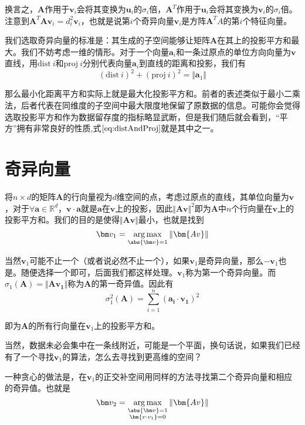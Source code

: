 \documentclass[UTF8]{ctexbook}
\newcommand{\Frobenius}[1]{\Vert #1 \Vert}
\begin{document}
换言之，$\bm A$作用于$\bm v_i$会将其变换为$\bm u_i$的$\sigma_i$倍，$\bm A^T$作用于$\bm u_i$会将其变换为$\bm v_i$的$\sigma_i$倍。注意到$\bm A^T\bm A \bm v_i = d_i^2 \bm v_i$，也就是说第$i$个奇异向量$\bm v_i$是方阵$\bm A^T A$的第$i$个特征向量。

我们选取奇异向量的标准是：其生成的子空间能够让矩阵$\bm A$在其上的投影平方和最大。我们不妨考虑一维的情形。对于一个向量$\bm a_i$和一条过原点的单位方向向量为$\bm v$直线，用$\text{dist} \ i$和$\text{proj} \ i$分别代表向量$\bm a_i$到直线的距离和投影，我们有
\begin{equation}
	(\text{dist} \ i)^2 + (\text{proj} \ i)^2 = \Vert \bm a_1 \Vert
	\label{eq:distAndProj}
\end{equation}
    

那么最小化距离平方和实际上就是最大化投影平方和。前者的表述类似于最小二乘法，后者代表在同维度的子空间中最大限度地保留了原数据的信息。可能你会觉得选取投影平方和作为数据留存度的指标略显武断，但是我们随后就会看到，“平方”拥有非常良好的性质,式$\ref{eq:distAndProj}$就是其中之一。

\section{奇异向量}

将$n \times d$的矩阵$\bm A$的行向量视为$d$维空间的点，考虑过原点的直线，其单位向量为$\bm v$，对于$\forall \bm a \in \mathbb{R}^d$，$\bm{v \cdot a}$就是$\bm a$在$\bm v$上的投影，因此$\Vert \bm{Av}\Vert^2$即为$\bm A$中$n$个行向量在$\bm v$上的投影平方和。我们的目的是使得$\Frobenius{\bm {Av}}$最小，也就是找到
\begin{equation}
	\bm v_1 = \mathop{\arg\max}_{\abs{\bm v} = 1}\Frobenius{\bm {Av}} 
\end{equation}

当然$\bm v_1$可能不止一个（或者说必然不止一个），如果$\bm v_1$是奇异向量，那么$-\bm v_1$也是。随便选择一个即可，后面我们都这样处理。$\bm v_1$称为第一个奇异向量。而$\sigma_1(\bm A) = \Frobenius{\bm{Av_1}}$称为$\bm A$的第一奇异值。因此有
\begin{equation}
	\sigma_1^2(\bm A) = \sum_{i=1}^{n}(\bm{a_i\cdot v_1})^2
\end{equation}

即为$\bm A$的所有行向量在$\bm v_1$上的投影平方和。

当然，数据未必会集中在一条线附近，可能是一个平面，换句话说，如果我们已经有了一个寻找$\bm v_1$的算法，怎么去寻找到更高维的空间？

一种贪心的做法是，在$\bm v_1$的正交补空间用同样的方法寻找第二个奇异向量和相应的奇异值。也就是
\begin{equation}
	\bm v_2 = \mathop{\arg\max}_{\substack{\abs{\bm v} = 1 \\ \bm{v\cdot v_1} = 0}}\Frobenius{\bm {Av}} 
\end{equation}
	
\end{document}
